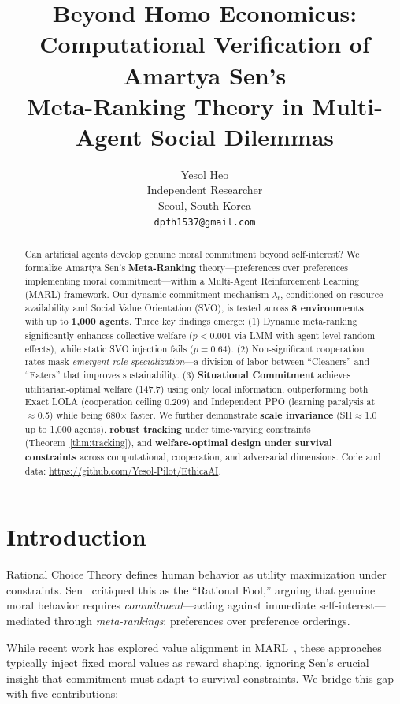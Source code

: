 \documentclass{article}
\title{Beyond Homo Economicus: Computational Verification of Amartya Sen's\\
Meta-Ranking Theory in Multi-Agent Social Dilemmas}
\author{
  Yesol Heo \\
  Independent Researcher \\
  Seoul, South Korea \\
  \texttt{dpfh1537@gmail.com}
}
\begin{document}
\maketitle

\begin{abstract}
Can artificial agents develop genuine moral commitment beyond self-interest?
We formalize Amartya Sen's \textbf{Meta-Ranking} theory---preferences over preferences implementing moral commitment---within a Multi-Agent Reinforcement Learning (MARL) framework.
Our dynamic commitment mechanism $\lambda_t$, conditioned on resource availability and Social Value Orientation (SVO), is tested across \textbf{8 environments} with up to \textbf{1,000 agents}.
Three key findings emerge:
(1) Dynamic meta-ranking significantly enhances collective welfare ($p{<}0.001$ via LMM with agent-level random effects), while static SVO injection fails ($p{=}0.64$).
(2) Non-significant cooperation rates mask \emph{emergent role specialization}---a division of labor between ``Cleaners'' and ``Eaters'' that improves sustainability.
(3) \textbf{Situational Commitment} achieves utilitarian-optimal welfare (147.7) using only local information, outperforming both Exact LOLA (cooperation ceiling 0.209) and Independent PPO (learning paralysis at $\approx$0.5) while being 680$\times$ faster.
We further demonstrate \textbf{scale invariance} (SII$\approx$1.0 up to 1,000 agents), \textbf{robust tracking} under time-varying constraints (Theorem~\ref{thm:tracking}), and \textbf{welfare-optimal design under survival constraints} across computational, cooperation, and adversarial dimensions.
Code and data: \url{https://github.com/Yesol-Pilot/EthicaAI}.
\end{abstract}

\section{Introduction}

Rational Choice Theory defines human behavior as utility maximization under constraints.
Sen~\cite{sen1977rational} critiqued this as the ``Rational Fool,'' arguing that genuine moral behavior requires \textit{commitment}---acting against immediate self-interest---mediated through \textit{meta-rankings}: preferences over preference orderings.

While recent work has explored value alignment in MARL~\cite{rodriguez2021multi,christoffersen2023get}, these approaches typically inject fixed moral values as reward shaping, ignoring Sen's crucial insight that commitment must adapt to survival constraints.
We bridge this gap with five contributions:
\end{document}
